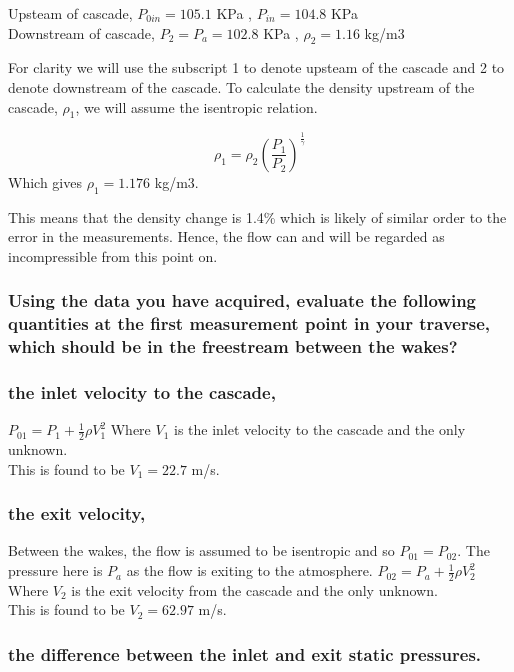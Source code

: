 \documentclass{article}
\begin{document}
Upsteam of cascade, $P_{0in} = 105.1$ KPa , $P_{in} = 104.8$ KPa \\
Downstream of cascade,  $P_2 = P_a = 102.8$ KPa , $\rho_2 = 1.16$ kg/m3

For clarity we will use the subscript 1 to denote upsteam of the cascade and 2 to denote downstream of the cascade.
To calculate the density upstream of the cascade, $\rho_1$, we will assume the isentropic relation.

\begin{equation}
    \rho_1 = \rho_2 \left( \frac{P_1}{P_2} \right)^\frac{1}{\gamma}
\end{equation}
Which gives $\rho_1 = 1.176$ kg/m3.

This means that the density change is 1.4\% which is likely of similar order to the error in the measurements.
Hence, the flow can and will be regarded as incompressible from this point on.

\subsubsection{Using the data you have acquired, evaluate the following quantities at the first
measurement point in your traverse, which should be in the freestream between the wakes?}

\subsubsection{the inlet velocity to the cascade,}
$P_{01} = P_1 + \frac{1}{2} \rho V_{1}^2$
Where $V_1$ is the inlet velocity to the cascade and the only unknown.\\
This is found to be $V_1 = 22.7$ m/s.

\subsubsection{the exit velocity,}
Between the wakes, the flow is assumed to be isentropic and so $P_{01} = P_{02}$.
The pressure here is $P_a$ as the flow is exiting to the atmosphere.
$P_{02} = P_a + \frac{1}{2} \rho V_{2}^2$
Where $V_2$ is the exit velocity from the cascade and the only unknown.\\
This is found to be $V_2 = 62.97$ m/s.

\subsubsection{the difference between the inlet and exit static pressures.}
\end{document}
